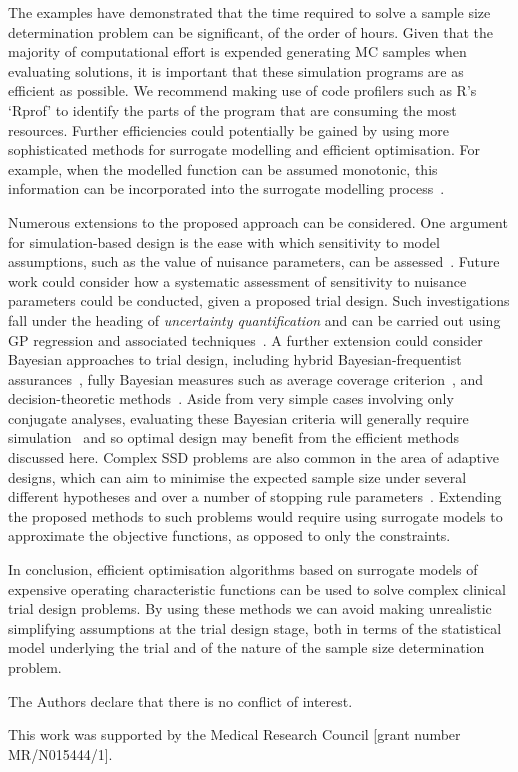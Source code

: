 \documentclass[sagev]{sagej}
\begin{document}
The examples have demonstrated that the time required to solve a sample size determination problem can be significant, of the order of hours. Given that the majority of computational effort is expended generating MC samples when evaluating solutions, it is important that these simulation programs are as efficient as possible. We recommend making use of code profilers such as R's `Rprof' to identify the parts of the program that are consuming the most resources. Further efficiencies could potentially be gained by using more sophisticated methods for surrogate modelling and efficient optimisation. For example, when the modelled function can be assumed monotonic, this information can be incorporated into the surrogate modelling process~\cite{Emmerich2011}.

Numerous extensions to the proposed approach can be considered. One argument for simulation-based design is the ease with which sensitivity to model assumptions, such as the value of nuisance parameters, can be assessed~\cite{Landau2013}. Future work could consider how a systematic assessment of sensitivity to nuisance parameters could be conducted, given a proposed trial design. Such investigations fall under the heading of \emph{uncertainty quantification} and can be carried out using GP regression and associated techniques~\cite{Kennedy2001}. A further extension could consider Bayesian approaches to trial design, including hybrid Bayesian-frequentist assurances~\cite{OHagan2005}, fully Bayesian measures such as average coverage criterion~\cite{Cao2009}, and decision-theoretic methods~\cite{Oakley2010}. Aside from very simple cases involving only conjugate analyses, evaluating these Bayesian criteria will generally require simulation~\cite{OHagan2005} and so optimal design may benefit from the efficient methods discussed here. Complex SSD problems are also common in the area of adaptive designs, which can aim to minimise the expected sample size under several different hypotheses and over a number of stopping rule parameters~\cite{Wason2012}.  Extending the proposed methods to such problems would require using surrogate models to approximate the objective functions, as opposed to only the constraints.

In conclusion, efficient optimisation algorithms based on surrogate models of expensive operating characteristic functions can be used to solve complex clinical trial design problems. By using these methods we can avoid making unrealistic simplifying assumptions at the trial design stage, both in terms of the statistical model underlying the trial and of the nature of the sample size determination problem.

\begin{dci}
The Authors declare that there is no conflict of interest.
\end{dci}

\begin{funding}
This work was supported by the Medical Research Council [grant number MR/N015444/1].
\end{funding}



\end{document}
